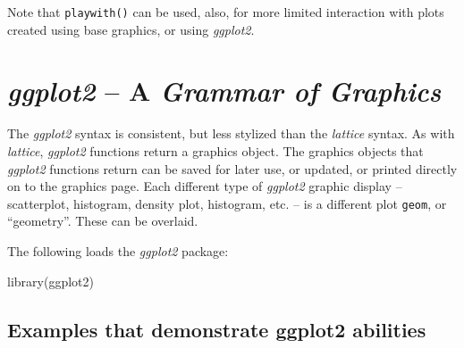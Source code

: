 \documentclass{tufte-book}\usepackage[]{graphicx}\usepackage[]{color}
\newcommand{\txtt}[1]{\texttt{#1}}
\begin{document}
Note that \txtt{playwith()} can be used, also, for more limited
interaction with plots created using base graphics, or
using \textit{ggplot2}.


\section{\textit{ggplot2} -- A \textit{Grammar of  Graphics}}\label{sec:ggplot}


The {\em ggplot2} syntax is consistent, but less stylized than the
\textit{lattice} syntax.  As with \textit{lattice}, {\em ggplot2}
functions return a graphics object. The graphics objects that {\em
    ggplot2} functions return can be saved for later use, or updated,
  or printed directly on to the graphics page. Each different type of
{\em ggplot2} graphic display -- scatterplot, histogram, density plot,
histogram, etc. -- is a different plot \txtt{geom}, or
``geometry''.  These can be overlaid.

The following loads the {\em ggplot2} package:
\begin{Schunk}
\begin{Sinput}
library(ggplot2)
\end{Sinput}
\end{Schunk}

\subsection{Examples that demonstrate ggplot2 abilities}
\end{document}
